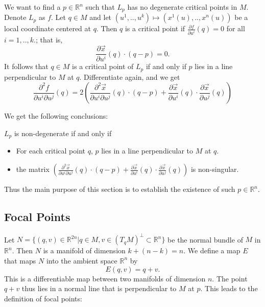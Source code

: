 \documentclass[12pt]{article}
\newcommand{\RR}{\mathbb{R}}      %
\newcommand{\vect}[1]{\vec{#1}}
\begin{document}
We want to find a $p \in \RR^n$ such that $L_p$ has no degenerate critical
points in $M$. Denote $L_p$ as $f$. Let $q \in M$ and let $(u^1, .., u^k)
\mapsto (x^1(u), .., x^n(u))$ be a local coordinate centered at $q$. Then $q$ is
a critical point if $\frac{\partial f}{\partial u^i}(q) = 0$ for all $i = 1, ..,
k.$; that is,
\begin{equation}
  \frac{\partial \vect{x}}{\partial u^i}(q) \cdot (q-p) = 0.
\end{equation}
It follows that $q \in M$ is a critical point of $L_p$ if and only if $p$ lies
in a line perpendicular to $M$ at $q$. Differentiate again, and we get
\begin{equation}
  \frac{\partial^2 f}{\partial u^i \partial u^j}(q) = 
  2\left(
    \frac{\partial^2 \vect{x}}{\partial u^i \partial u^j}(q) \cdot (q-p) +
    \frac{\partial \vect{x}}{\partial u^i}(q) \cdot \frac{\partial \vect{x}}{\partial u^j}(q)
  \right)
\end{equation}

We get the following conclusions:


$L_p$ is non-degenerate if and only if

\begin{itemize}
\item For each critical point $q$, $p$ lies in a line perpendicular to $M$ at
  $q$.
\item the matrix $\left(
    \frac{\partial^2 \vect{x}}{\partial u^i \partial u^j}(q) \cdot (q-p) +
    \frac{\partial \vect{x}}{\partial u^i}(q) \cdot \frac{\partial \vect{x}}{\partial u^j}(q)
  \right)$
  is non-singular.
\end{itemize}

Thus the main purpose of this section is to establish the existence of such $p
\in \RR^n$.

\subsection{Focal Points}

Let $N = \{ (q,v) \in \RR^{2n} | q \in M, v \in (T_qM)^{\perp} \subset \RR^n \}$
be the normal bundle of $M$ in $\RR^n$. Then $N$ is a manifold of dimension
$k+(n-k)=n$. We define a map $E$ that maps $N$ into the ambient space $\RR^n$ by
\begin{equation}
  E(q, v) = q + v.
\end{equation}
This is a differentiable map between two manifolds of dimension $n$. The point
$q+v$ thus lies in a normal line that is perpendicular to $M$ at $p$. This leads
to the definition of focal points:
\end{document}
